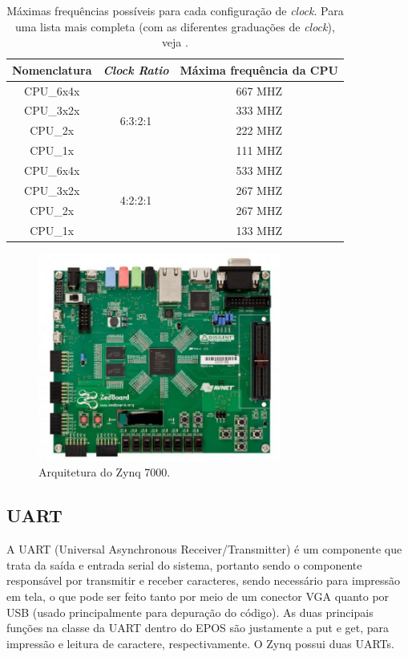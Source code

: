 \documentclass{ufscThesis/ufscThesis} %
\begin{document}
\begin{table}[ht]
	\centering
	\begin{tabular}{ccc}
		\hline\hline
		Nomenclatura & \emph{Clock Ratio} & Máxima frequência da CPU\\[0.5ex]
		\hline
		CPU\_6x4x & \multirow{4}{*}{6:3:2:1} & 667 MHZ\\
		CPU\_3x2x &                          & 333 MHZ\\
		CPU\_2x   &                          & 222 MHZ\\
		CPU\_1x   &                          & 111 MHZ\\
		\hline
		CPU\_6x4x & \multirow{4}{*}{4:2:2:1} & 533 MHZ\\
		CPU\_3x2x &                          & 267 MHZ\\
		CPU\_2x   &                          & 267 MHZ\\
		CPU\_1x   &                          & 133 MHZ\\[1ex]
		\hline
	\end{tabular}
	\caption{Máximas frequências possíveis para cada configuração de \emph{clock}. Para uma lista mais completa (com as diferentes graduações de \emph{clock}), veja \cite[p.~13]{data_sheet}.}
	\label{tab:clocks}
\end{table}

\begin{figure}[ht!]
    \centering
    \includegraphics[width=8cm]{figuras/zedboard}
	\caption{Arquitetura do Zynq 7000.}
\end{figure}

\subsection{UART}
A UART (Universal Asynchronous Receiver/Transmitter) é um componente que trata da saída e entrada serial do sistema, portanto sendo o componente responsável por transmitir e receber caracteres, sendo necessário para impressão em tela, o que pode ser feito tanto por meio de um conector VGA quanto por USB (usado principalmente para depuração do código). As duas principais funções na classe da UART dentro do EPOS são justamente a put e get, para impressão e leitura de caractere, respectivamente. O Zynq possui duas UARTs.
\end{document}
